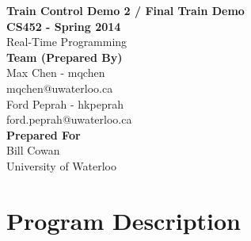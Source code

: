 \documentclass[12pt]{article}
\begin{document}
\thispagestyle{empty}
\begin{center}
  {\bf\Large Train Control Demo 2 / Final Train Demo}\\
  {\bf\large CS452 - Spring 2014}\\
  Real-Time Programming\vspace{5cm}\\
  {\bf Team (Prepared By) }\\
  Max Chen - mqchen\\
  mqchen@uwaterloo.ca\\[1\baselineskip]
  Ford Peprah - hkpeprah\\
  ford.peprah@uwaterloo.ca\vspace{5cm}\\
  {\bf Prepared For} \\
  Bill Cowan\\
  University of Waterloo\\
\end{center}
\newpage
\thispagestyle{empty}
\tableofcontents
\newpage
\section{Program Description}
\end{document}
